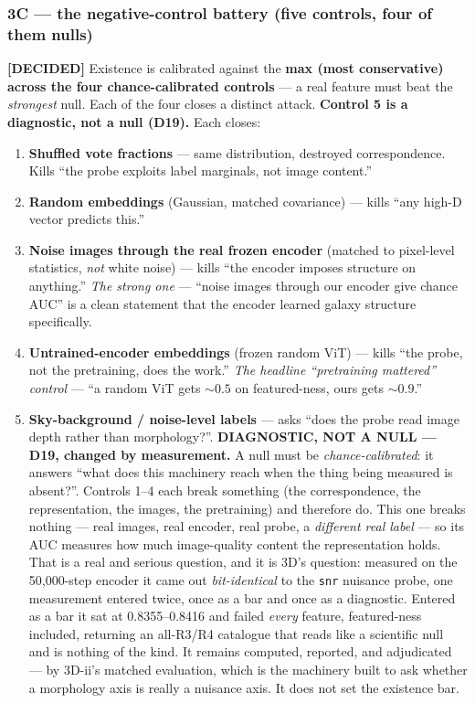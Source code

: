 \documentclass[11pt,a4paper]{article}
\newcommand{\dec}{\textcolor{decided}{\sffamily\bfseries[DECIDED]}}
\begin{document}
\subsubsection{3C --- the negative-control battery (five controls, four of them nulls)}
\dec{} Existence is calibrated against the \textbf{max (most conservative) across the four
chance-calibrated controls} --- a real feature must beat the \emph{strongest} null. Each of the
four closes a distinct attack. \textbf{Control 5 is a diagnostic, not a null (D19).} Each closes:
\begin{enumerate}[leftmargin=1.5em,itemsep=1pt]
\item \textbf{Shuffled vote fractions} --- same distribution, destroyed correspondence. Kills
``the probe exploits label marginals, not image content.''
\item \textbf{Random embeddings} (Gaussian, matched covariance) --- kills ``any high-D vector
predicts this.''
\item \textbf{Noise images through the real frozen encoder} (matched to pixel-level statistics,
\emph{not} white noise) --- kills ``the encoder imposes structure on anything.'' \emph{The
strong one} --- ``noise images through our encoder give chance AUC'' is a clean statement that
the encoder learned galaxy structure specifically.
\item \textbf{Untrained-encoder embeddings} (frozen random ViT) --- kills ``the probe, not the
pretraining, does the work.'' \emph{The headline ``pretraining mattered'' control} --- ``a random
ViT gets ${\sim}0.5$ on featured-ness, ours gets ${\sim}0.9$.''
\item \textbf{Sky-background / noise-level labels} --- asks ``does the probe read image depth
rather than morphology?''. \textbf{DIAGNOSTIC, NOT A NULL --- D19, changed by measurement.} A
null must be \emph{chance-calibrated}: it answers ``what does this machinery reach when the thing
being measured is absent?''. Controls 1--4 each break something (the correspondence, the
representation, the images, the pretraining) and therefore do. This one breaks nothing --- real
images, real encoder, real probe, a \emph{different real label} --- so its AUC measures how much
image-quality content the representation holds. That is a real and serious question, and it is
3D's question: measured on the 50,000-step encoder it came out \emph{bit-identical} to the
\texttt{snr} nuisance probe, one measurement entered twice, once as a bar and once as a
diagnostic. Entered as a bar it sat at 0.8355--0.8416 and failed \emph{every} feature,
featured-ness included, returning an all-R3/R4 catalogue that reads like a scientific null and is
nothing of the kind. It remains computed, reported, and adjudicated --- by 3D-ii's matched
evaluation, which is the machinery built to ask whether a morphology axis is really a nuisance
axis. It does not set the existence bar.
\end{enumerate}
\end{document}
